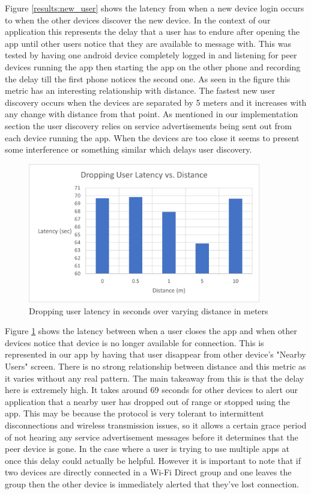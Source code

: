 \documentclass[10pt]{article}
\begin{document}
Figure \ref{results:new_user} shows the latency from when a new device login occurs to when the other devices discover the new device. In the context of our application this represents the delay that a user has to endure after opening the app until other users notice that they are available to message with. This was tested by having one android device completely logged in and listening for peer devices running the app then starting the app on the other phone and recording the delay till the first phone notices the second one. As seen in the figure this metric has an interesting relationship with distance. The fastest new user discovery occurs when the devices are separated by 5 meters and it increases with any change with distance from that point. As mentioned in our implementation section the user discovery relies on service advertisements being sent out from each device running the app. When the devices are too close it seems to present some interference or something similar which delays user discovery.

\begin{figure}[h!]
    \centering
    \includegraphics[width=4in]{dropping_user_latency_graph.png}
    \caption{Dropping user latency in seconds over varying distance in meters}
    \label{results:dropping_user}
\end{figure}

Figure \ref{results:dropping_user} shows the latency between when a user closes the app and when other devices notice that device is no longer available for connection. This is represented in our app by having that user disappear from other device's "Nearby Users" screen. There is no strong relationship between distance and this metric as it varies without any real pattern. The main takeaway from this is that the delay here is extremely high. It takes around 69 seconds for other devices to alert our application that a nearby user has dropped out of range or stopped using the app. This may be because the protocol is very tolerant to intermittent disconnections and wireless transmission issues, so it allows a certain grace period of not hearing any service advertisement messages before it determines that the peer device is gone. In the case where a user is trying to use multiple apps at once this delay could actually be helpful. However it is important to note that if two devices are directly connected in a Wi-Fi Direct group and one leaves the group then the other device is immediately alerted that they've lost connection.
\end{document}
